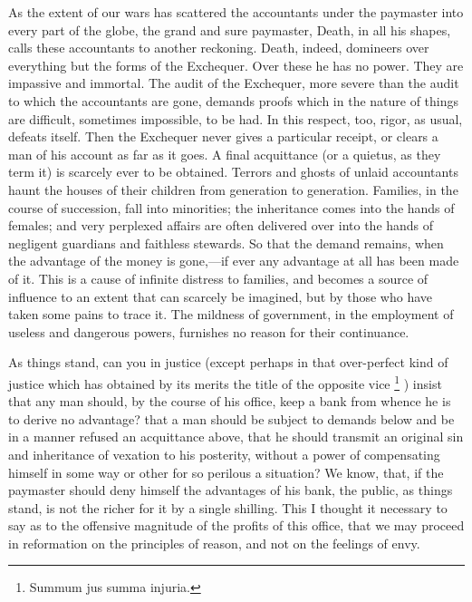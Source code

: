As the extent of our wars has scattered the accountants under the paymaster into every part of the globe, the grand and sure paymaster, Death, in all his shapes, calls these accountants to another reckoning. Death, indeed, domineers over everything but the forms of the Exchequer. Over these he has no power. They are impassive and immortal. The audit of the Exchequer, more severe than the audit to which the accountants are gone, demands proofs which in the nature of things are difficult, sometimes impossible, to be had. In this respect, too, rigor, as usual, defeats itself. Then the Exchequer never gives a particular receipt, or clears a man of his account as far as it goes. A final acquittance (or a quietus, as they term it) is scarcely ever to be obtained. Terrors and ghosts of unlaid accountants haunt the houses of their children from generation to generation. Families, in the course of succession, fall into minorities; the inheritance comes into the hands of females; and very perplexed affairs are often delivered over into the hands of negligent guardians and faithless stewards. So that the demand remains, when the advantage of the money is gone,—if ever any advantage at all has been made of it. This is a cause of infinite distress to families, and becomes a source of influence to an extent that can scarcely be imagined, but by those who have taken some pains to trace it. The mildness of government, in the employment of useless and dangerous powers, furnishes no reason for their continuance.

As things stand, can you in justice (except perhaps in that over-perfect kind of justice which has obtained by its merits the title of the opposite vice
\footnote{ Summum jus summa injuria.}
) insist that any man should, by the course of his office, keep a bank from whence he is to derive no advantage? that a man should be subject to demands below and be in a manner refused an acquittance above, that he should transmit an original sin and inheritance of vexation to his posterity, without a power of compensating himself in some way or other for so perilous a situation? We know, that, if the paymaster should deny himself the advantages of his bank, the public, as things stand, is not the richer for it by a single shilling. This I thought it necessary to say as to the offensive magnitude of the profits of this office, that we may proceed in reformation on the principles of reason, and not on the feelings of envy.

